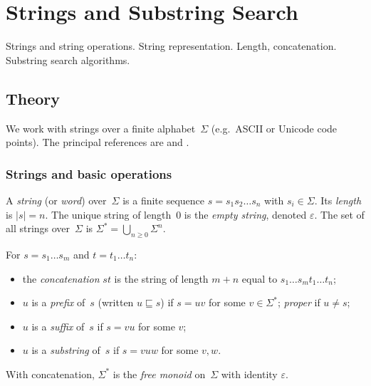 
\section{Strings and Substring Search}
\label{sec:1.3.02-strings-substring-search}

\begin{ticket}
Strings and string operations. String representation. Length, concatenation. Substring search algorithms.
\end{ticket}

\subsection*{Theory}

We work with strings over a finite alphabet~$\Sigma$ (e.g.\ ASCII or
Unicode code points). The principal references are
\cite[Ch.~32]{CLRS2013} and \cite{Skiena2014}.

\subsubsection*{Strings and basic operations}

\begin{definition}[String]
\label{def:string}
A \emph{string} (or \emph{word}) over~$\Sigma$ is a finite sequence
$s = s_1 s_2 \dots s_n$ with $s_i \in \Sigma$. Its \emph{length} is
$|s| = n$. The unique string of length~$0$ is the \emph{empty string},
denoted $\varepsilon$. The set of all strings over~$\Sigma$ is
$\Sigma^* = \bigcup_{n \geq 0} \Sigma^n$.
\end{definition}

\begin{definition}
\label{def:string-ops}
For $s = s_1 \dots s_m$ and $t = t_1 \dots t_n$:
\begin{itemize}
  \item the \emph{concatenation} $s t$ is the string of length $m + n$
        equal to $s_1 \dots s_m t_1 \dots t_n$;
  \item $u$ is a \emph{prefix} of~$s$ (written $u \sqsubseteq s$) if
        $s = u v$ for some $v \in \Sigma^*$; \emph{proper} if $u \neq s$;
  \item $u$ is a \emph{suffix} of~$s$ if $s = v u$ for some $v$;
  \item $u$ is a \emph{substring} of~$s$ if $s = v u w$ for some $v, w$.
\end{itemize}
With concatenation, $\Sigma^*$ is the \emph{free monoid} on~$\Sigma$
with identity $\varepsilon$.
\end{definition}


